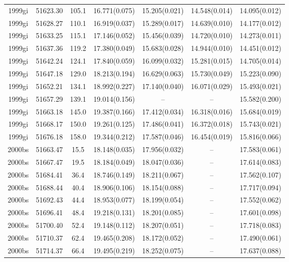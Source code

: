 \begin{table*}
\begin{tabular}{ccccccc}
1999gi	  & 51623.30	 & 105.1	& 16.771(0.075)	 & 15.205(0.021)	 & 14.548(0.014)	 & 14.095(0.012) \\ 
1999gi	  & 51628.27	 & 110.1	& 16.919(0.037)	 & 15.289(0.017)	 & 14.639(0.010)	 & 14.177(0.012) \\ 
1999gi	  & 51633.25	 & 115.1	& 17.146(0.052)	 & 15.456(0.039)	 & 14.720(0.010)	 & 14.273(0.011) \\ 
1999gi	  & 51637.36	 & 119.2	& 17.380(0.049)	 & 15.683(0.028)	 & 14.944(0.010)	 & 14.451(0.012) \\ 
1999gi	  & 51642.24	 & 124.1	& 17.840(0.059)	 & 16.099(0.032)	 & 15.281(0.015)	 & 14.705(0.014) \\ 
1999gi	  & 51647.18	 & 129.0	& 18.213(0.194)	 & 16.629(0.063)	 & 15.730(0.049)	 & 15.223(0.090) \\ 
1999gi	  & 51652.21	 & 134.1	& 18.992(0.227)	 & 17.140(0.040)	 & 16.071(0.029)	 & 15.493(0.021) \\ 
1999gi	  & 51657.29	 & 139.1	& 19.014(0.156)	 & --	 & --	 & 15.582(0.200) \\ 
1999gi	  & 51663.18	 & 145.0	& 19.387(0.166)	 & 17.412(0.034)	 & 16.318(0.016)	 & 15.684(0.019) \\ 
1999gi	  & 51668.17	 & 150.0	& 19.261(0.125)	 & 17.486(0.041)	 & 16.372(0.018)	 & 15.743(0.021) \\ 
1999gi	  & 51676.18	 & 158.0	& 19.344(0.212)	 & 17.587(0.046)	 & 16.454(0.019)	 & 15.816(0.066) \\ 
2000bs	  & 51663.47	 & 15.5	& 18.148(0.035)	 & 17.956(0.032)	 & --	 & 17.583(0.061) \\ 
2000bs	  & 51667.47	 & 19.5	& 18.184(0.049)	 & 18.047(0.036)	 & --	 & 17.614(0.083) \\ 
2000bs	  & 51684.41	 & 36.4	& 18.746(0.149)	 & 18.211(0.067)	 & --	 & 17.562(0.107) \\ 
2000bs	  & 51688.44	 & 40.4	& 18.906(0.106)	 & 18.154(0.088)	 & --	 & 17.717(0.094) \\ 
2000bs	  & 51692.43	 & 44.4	& 18.953(0.077)	 & 18.199(0.054)	 & --	 & 17.552(0.062) \\ 
2000bs	  & 51696.41	 & 48.4	& 19.218(0.131)	 & 18.201(0.085)	 & --	 & 17.601(0.098) \\ 
2000bs	  & 51700.40	 & 52.4	& 19.148(0.112)	 & 18.207(0.051)	 & --	 & 17.718(0.083) \\ 
2000bs	  & 51710.37	 & 62.4	& 19.465(0.208)	 & 18.172(0.052)	 & --	 & 17.490(0.061) \\ 
2000bs	  & 51714.37	 & 66.4	& 19.495(0.219)	 & 18.252(0.075)	 & --	 & 17.637(0.088) \\ 

\end{tabular}
\end{table*}
